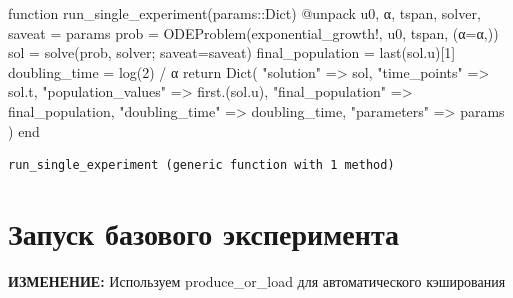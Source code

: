 \documentclass[
  12pt,
  a4paper,
  DIV=11,
  numbers=noendperiod]{scrreprt}
\newenvironment{Shaded}{\begin{snugshade}}{\end{snugshade}}
\newcommand{\ControlFlowTok}[1]{\textcolor[rgb]{0.00,0.23,0.31}{#1}}
\newcommand{\DataTypeTok}[1]{\textcolor[rgb]{0.68,0.00,0.00}{#1}}
\newcommand{\FloatTok}[1]{\textcolor[rgb]{0.68,0.00,0.00}{#1}}
\newcommand{\FunctionTok}[1]{\textcolor[rgb]{0.28,0.35,0.67}{#1}}
\newcommand{\KeywordTok}[1]{\textcolor[rgb]{0.00,0.23,0.31}{#1}}
\newcommand{\NormalTok}[1]{\textcolor[rgb]{0.00,0.23,0.31}{#1}}
\newcommand{\OperatorTok}[1]{\textcolor[rgb]{0.37,0.37,0.37}{#1}}
\newcommand{\PreprocessorTok}[1]{\textcolor[rgb]{0.68,0.00,0.00}{#1}}
\newcommand{\StringTok}[1]{\textcolor[rgb]{0.13,0.47,0.30}{#1}}
\begin{document}
\begin{Shaded}
\begin{Highlighting}[]
\KeywordTok{function} \FunctionTok{run\_single\_experiment}\NormalTok{(params}\OperatorTok{::}\DataTypeTok{Dict}\NormalTok{)}
    \PreprocessorTok{@unpack}\NormalTok{ u0, α, tspan, solver, saveat }\OperatorTok{=}\NormalTok{ params}
\NormalTok{    prob }\OperatorTok{=} \FunctionTok{ODEProblem}\NormalTok{(exponential\_growth!, u0, tspan, (α}\OperatorTok{=}\NormalTok{α,))}
\NormalTok{    sol }\OperatorTok{=} \FunctionTok{solve}\NormalTok{(prob, solver; saveat}\OperatorTok{=}\NormalTok{saveat)}
\NormalTok{    final\_population }\OperatorTok{=} \FunctionTok{last}\NormalTok{(sol.u)[}\FloatTok{1}\NormalTok{]}
\NormalTok{    doubling\_time }\OperatorTok{=} \FunctionTok{log}\NormalTok{(}\FloatTok{2}\NormalTok{) }\OperatorTok{/}\NormalTok{ α}
    \ControlFlowTok{return} \FunctionTok{Dict}\NormalTok{(}
        \StringTok{"solution"} \OperatorTok{=\textgreater{}}\NormalTok{ sol,}
        \StringTok{"time\_points"} \OperatorTok{=\textgreater{}}\NormalTok{ sol.t,}
        \StringTok{"population\_values"} \OperatorTok{=\textgreater{}} \FunctionTok{first}\NormalTok{.(sol.u),}
        \StringTok{"final\_population"} \OperatorTok{=\textgreater{}}\NormalTok{ final\_population,}
        \StringTok{"doubling\_time"} \OperatorTok{=\textgreater{}}\NormalTok{ doubling\_time,}
        \StringTok{"parameters"} \OperatorTok{=\textgreater{}}\NormalTok{ params}
\NormalTok{    )}
\KeywordTok{end}
\end{Highlighting}
\end{Shaded}

\begin{verbatim}
run_single_experiment (generic function with 1 method)
\end{verbatim}

\section{Запуск базового
эксперимента}\label{ux437ux430ux43fux443ux441ux43a-ux431ux430ux437ux43eux432ux43eux433ux43e-ux44dux43aux441ux43fux435ux440ux438ux43cux435ux43dux442ux430}

\textbf{ИЗМЕНЕНИЕ:} Используем produce\_or\_load для автоматического
кэширования
\end{document}
